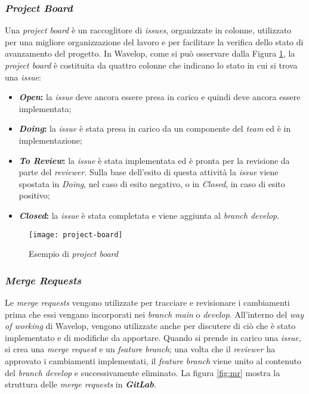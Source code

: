 \newpage
\subsubsection{\emph{Project Board}}
Una \emph{project board} è un raccoglitore di \emph{issues}, organizzate in colonne, utilizzato per una migliore organizzazione del lavoro e per facilitare la verifica dello stato di avanzamento del progetto. 
In Wavelop, come si può osservare dalla Figura \ref{fig:board}, la \emph{project board} è costituita da quattro colonne che indicano lo stato in cui si trova una \emph{issue}:
\begin{itemize}
  \item \textbf{\emph{Open}:} la \emph{issue} deve ancora essere presa in carico e quindi deve ancora essere implementata;
  \item \textbf{\emph{Doing}:} la \emph{issue} è stata presa in carico da un componente del \emph{team} ed è in implementazione;
  \item \textbf{\emph{To Review}:} la \emph{issue} è stata implementata ed è pronta per la revisione da parte del \emph{reviewer}. Sulla base dell'esito di questa attività la \emph{issue} viene spostata in \emph{Doing}, nel caso di esito negativo, o in \emph{Closed}, in caso di esito positivo;
  \item \textbf{\emph{Closed}:} la \emph{issue} è stata completata e viene aggiunta al \emph{branch develop}.
\end{itemize}

\begin{figure}[!ht]
  \begin{center}
    \texttt{[image: project-board]}
    \caption{Esempio di \emph{project board}}
    \label{fig:board}
  \end{center}
\end{figure}

\newpage
\subsubsection{\emph{Merge Requests}}
Le \emph{merge requests} vengono utilizzate per tracciare e revisionare i cambiamenti prima che essi vengano incorporati nei \emph{branch main} o \emph{develop}. 
All'interno del \emph{way of working} di Wavelop, vengono utilizzate anche per discutere di ciò che è stato implementato e di modifiche da apportare. 
Quando si prende in carico una \emph{issue}, si crea una \emph{merge request} e un \emph{feature branch}; una volta che il \emph{reviewer} ha approvato i cambiamenti implementati, il \emph{feature branch} viene unito al contenuto del \emph{branch develop} e successivamente eliminato.
La figura \ref{fig:mr} mostra la struttura delle \emph{merge requests} in \textbf{\emph{GitLab}}.

